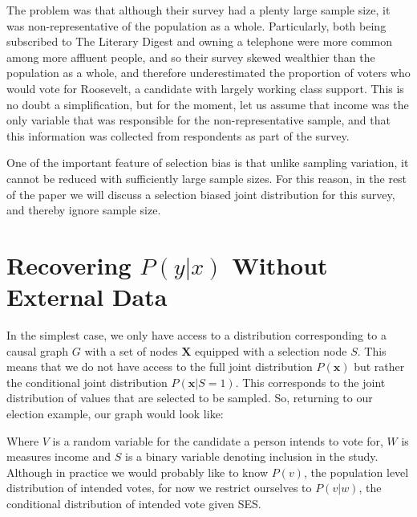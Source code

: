 \documentclass[12pt]{article}
\theoremstyle{definition}
\begin{document}
The problem was that although their survey had a plenty large sample size, it was non-representative of the population as a whole. Particularly, both being subscribed to The Literary Digest and owning a telephone were more common among more affluent people, and so their survey skewed wealthier than the population as a whole, and therefore underestimated the proportion of voters who would vote for Roosevelt, a candidate with largely working class support. This is no doubt a simplification, but for the moment, let us assume that income was the only variable that was responsible for the non-representative sample, and that this information was collected from respondents as part of the survey. 

One of the important feature of selection bias is that unlike sampling variation, it cannot be reduced with sufficiently large sample sizes. For this reason, in the rest of the paper we will discuss a selection biased joint distribution for this survey, and thereby ignore sample size.

\section{Recovering $P(y|x)$ Without External Data}
In the simplest case, we only have access to a distribution corresponding to a causal graph $G$  with a set of nodes $\mathbf{X}$ equipped with a selection node $S$. This means that we do not have access to the full joint distribution $P(\mathbf{x})$ but rather the conditional joint distribution $P(\mathbf{x} | S = 1)$. This corresponds to the joint distribution of values that are selected to be sampled. So, returning to our election example, our graph would look like:
\begin{center}
\end{center}
Where $V$ is a random variable for the candidate a person intends to vote for, $W$ is measures income and $S$ is a binary variable denoting inclusion in the study. Although in practice we would probably like to know $P(v)$, the population level distribution of intended votes, for now we restrict ourselves to $P(v | w)$, the conditional distribution of intended vote given SES. 
\end{document}
